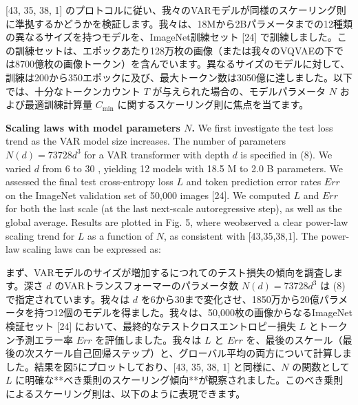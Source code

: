 \documentclass{article}
\begin{document}
[43, 35, 38, 1] のプロトコルに従い、我々のVARモデルが同様のスケーリング則に準拠するかどうかを検証します。我々は、18Mから2Bパラメータまでの12種類の異なるサイズを持つモデルを、ImageNet訓練セット [24] で訓練しました。この訓練セットは、エポックあたり128万枚の画像（または我々のVQVAEの下では8700億枚の画像トークン）を含んでいます。異なるサイズのモデルに対して、訓練は200から350エポックに及び、最大トークン数は3050億に達しました。以下では、十分なトークンカウント $T$ が与えられた場合の、モデルパラメータ $N$ および最適訓練計算量 $C_{\min}$ に関するスケーリング則に焦点を当てます。

\textbf{Scaling laws with model parameters $N$.} We first investigate the test loss trend as the VAR model size increases. The number of parameters $N(d)=73728 d^{3}$ for a VAR transformer with depth $d$ is specified in (8). We varied $d$ from 6 to 30 , yielding 12 models with 18.5 M to 2.0 B parameters. We assessed the final test cross-entropy loss $L$ and token prediction error rates $E r r$ on the ImageNet validation set of 50,000 images [24]. We computed $L$ and $E r r$ for both the last scale (at the last next-scale autoregressive step), as well as the global average. Results are plotted in Fig. 5, where weobserved a clear power-law scaling trend for $L$ as a function of $N$, as consistent with [43,35,38,1]. The power-law scaling laws can be expressed as:

まず、VARモデルのサイズが増加するにつれてのテスト損失の傾向を調査します。深さ $d$ のVARトランスフォーマーのパラメータ数 $N(d) = 73728 d^3$ は (8) で指定されています。我々は $d$ を6から30まで変化させ、1850万から20億パラメータを持つ12個のモデルを得ました。我々は、50,000枚の画像からなるImageNet検証セット [24] において、最終的なテストクロスエントロピー損失 $L$ とトークン予測エラー率 $Err$ を評価しました。我々は $L$ と $Err$ を、最後のスケール（最後の次スケール自己回帰ステップ）と、グローバル平均の両方について計算しました。結果を図5にプロットしており、[43, 35, 38, 1] と同様に、$N$ の関数として $L$ に明確な**べき乗則のスケーリング傾向**が観察されました。このべき乗則によるスケーリング則は、以下のように表現できます。

\end{document}
